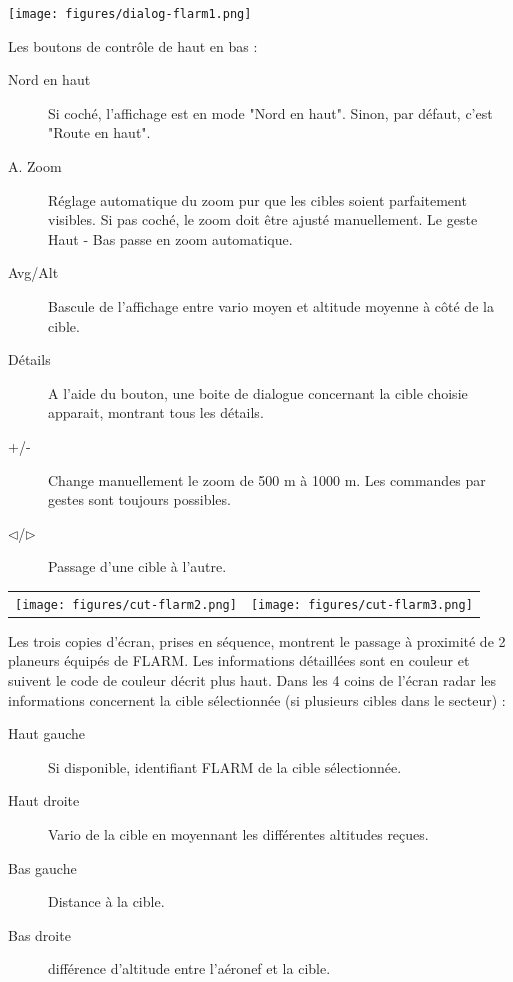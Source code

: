 \begin{center}
\texttt{[image: figures/dialog-flarm1.png]}
\end{center}

Les boutons de contrôle de haut en bas :
\begin{description}
\item[Nord en haut]  Si coché, l'affichage est en mode "Nord en haut". Sinon, par défaut, c'est "Route en haut".
\item[A. Zoom]   Réglage automatique du zoom pur que les cibles soient parfaitement visibles. Si pas coché, le zoom doit être ajusté manuellement. Le geste Haut - Bas passe en zoom automatique.
\item[Avg/Alt]   Bascule de l'affichage entre vario moyen et altitude moyenne à côté de la cible.
\item[Détails]   A l'aide du bouton, une boite de dialogue concernant la cible choisie apparait, montrant tous les détails.
\item[+/-]   Change manuellement le zoom de 500 m à 1000 m. Les commandes par gestes sont toujours possibles.
\item[$\triangleleft$/$\triangleright$]   Passage d'une cible à l'autre.
\end{description}

\begin{center}
\begin{tabular}{c c}
\texttt{[image: figures/cut-flarm2.png]}&
\texttt{[image: figures/cut-flarm3.png]}\\
\end{tabular}
\end{center}
Les trois copies d'écran, prises en séquence, montrent le passage à proximité de 2 planeurs équipés de FLARM. Les informations détaillées sont en couleur et suivent le code de couleur décrit plus haut. 
Dans les 4 coins de l'écran radar les informations concernent la cible sélectionnée (si plusieurs cibles dans le secteur) :
\begin{description}
\item[Haut gauche]  Si disponible, identifiant FLARM de la cible sélectionnée.
\item[Haut droite]  Vario de la cible en moyennant les différentes altitudes reçues.
\item[Bas gauche]  Distance à la cible.
\item[Bas droite]  différence d'altitude entre l'aéronef et la cible. 
\end{description}

